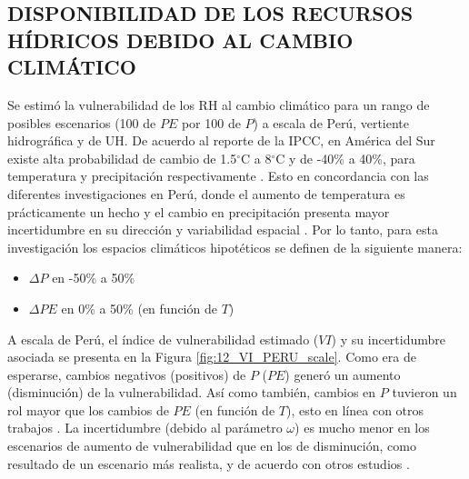 \documentclass[12pt]{article}
\begin{document}


\thispagestyle{empty}

\subsection{DISPONIBILIDAD DE LOS RECURSOS HÍDRICOS DEBIDO AL CAMBIO CLIMÁTICO}

Se estimó la vulnerabilidad de los RH al cambio climático para un rango de posibles escenarios (100 de $PE$ por 100 de $P$) a escala de Perú, vertiente hidrográfica y de UH. De acuerdo al reporte de la IPCC, en América del Sur existe alta probabilidad de cambio de 1.5$^{\circ}$C a 8$^{\circ}$C y de -40\% a 40\%, para temperatura y precipitación respectivamente
\citep{stocker2013climate}. Esto en concordancia con las diferentes investigaciones en Perú, donde el aumento de temperatura es prácticamente un hecho \citep{vuille2015impact,rosas2016towards,lopez2016recent,vicente2018recent,hunziker2018effects} y el cambio en precipitación presenta mayor incertidumbre en su dirección y variabilidad espacial \citep{zubieta2017spatial,de2017can,Aybar2019,Huerta2019a}. Por lo tanto, para esta investigación los espacios climáticos hipotéticos se definen de la siguiente manera:

\begin{itemize}

	\item $\Delta P$ en -50\% a 50\%
	\item $\Delta PE$ en 0\% a 50\% (en función de $T$)

\end{itemize}



A escala de Perú, el índice de vulnerabilidad estimado ($VI$) y su incertidumbre asociada se presenta en la Figura \ref{fig:12_VI_PERU_scale}. Como era de esperarse, cambios negativos (positivos) de $P$ ($PE$) generó un aumento (disminución) de la vulnerabilidad. Así como también, cambios en $P$ tuvieron un rol mayor que los cambios de $PE$ (en función de $T$), esto en línea con otros trabajos \citep{Singh2015,zhang2018bottom}. La incertidumbre (debido al parámetro $\omega$) es mucho menor en los escenarios de aumento de vulnerabilidad que en los de disminución, como resultado de un escenario más realista, y de acuerdo con otros estudios \citep{singh2011trading,Singh2015,zhang2018bottom}.
\end{document}
